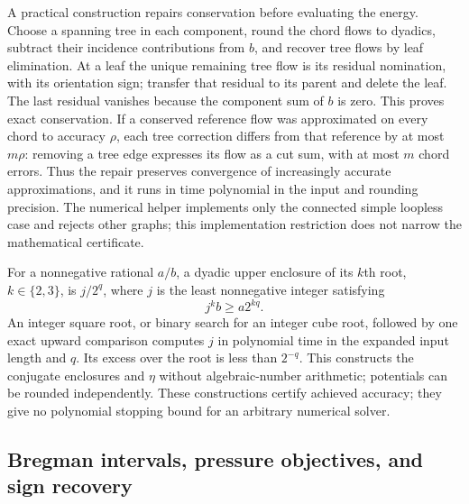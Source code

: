 A practical construction repairs conservation before evaluating the
energy. Choose a spanning tree in each component, round the chord flows
to dyadics, subtract their incidence contributions from $b$, and recover
tree flows by leaf elimination. At a leaf the unique remaining tree
flow is its residual nomination, with its orientation sign; transfer
that residual to its parent and delete the leaf. The last residual
vanishes because the component sum of $b$ is zero. This proves exact
conservation. If a conserved reference flow was approximated on every
chord to accuracy $\rho$, each tree correction differs from that
reference by at most $m\rho$: removing a tree edge expresses its flow
as a cut sum, with at most $m$ chord errors. Thus the repair preserves
convergence of increasingly accurate approximations, and it runs in time
polynomial in the input and rounding precision. The numerical helper
implements only the connected simple loopless case and rejects other
graphs; this implementation restriction does not narrow the mathematical
certificate.

For a nonnegative rational $a/b$, a dyadic upper enclosure of its
$k$th root, $k\in\{2,3\}$, is $j/2^q$, where $j$ is the least
nonnegative integer satisfying
\begin{equation}
 j^k b\ge a2^{kq}.
 \label{eq:a-cert-root}
\end{equation}
An integer square root, or binary search for an integer cube root,
followed by one exact upward comparison computes $j$ in polynomial
time in the expanded input length and $q$. Its excess over the root
is less than $2^{-q}$. This constructs the conjugate enclosures and
$\eta$ without algebraic-number arithmetic; potentials can be rounded
independently. These constructions certify achieved accuracy; they give
no polynomial stopping bound for an arbitrary numerical solver.

\subsection{Bregman intervals, pressure objectives, and sign recovery}

